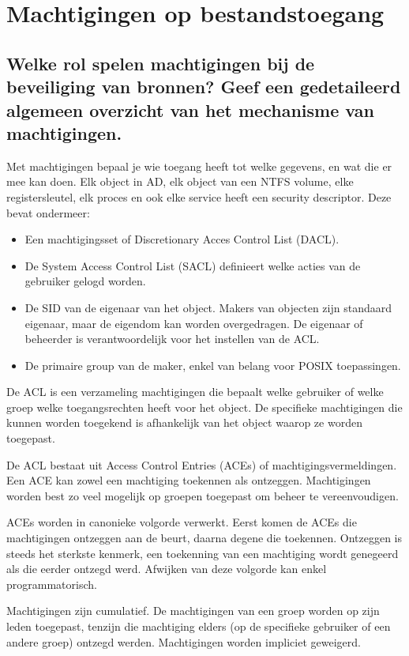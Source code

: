 \chapter{Machtigingen op bestandstoegang}

\section{Welke rol spelen machtigingen bij de beveiliging van bronnen? Geef een
gedetaileerd algemeen overzicht van het mechanisme van machtigingen.}

Met machtigingen bepaal je wie toegang heeft tot welke gegevens, en wat die er
mee kan doen. Elk object in AD, elk object van een NTFS volume, elke
registersleutel, elk proces en ook elke service heeft een security descriptor.
Deze bevat ondermeer:
\begin{itemize}
	\item Een machtigingsset of Discretionary Acces Control List (DACL).
	\item De System Access Control List (SACL) definieert welke acties van
		de gebruiker gelogd worden.
	\item De SID van de eigenaar van het object. Makers van objecten zijn
		standaard eigenaar, maar de eigendom kan worden overgedragen. De
		eigenaar of beheerder is verantwoordelijk voor het instellen van
		de ACL.
	\item De primaire group van de maker, enkel van belang voor POSIX
		toepassingen.
\end{itemize}

De ACL is een verzameling machtigingen die bepaalt welke gebruiker of welke
groep welke toegangsrechten heeft voor het object. De specifieke machtigingen
die kunnen worden toegekend is afhankelijk van het object waarop ze worden
toegepast.

De ACL bestaat uit Access Control Entries (ACEs) of machtigingsvermeldingen. Een
ACE kan zowel een machtiging toekennen als ontzeggen. Machtigingen worden best
zo veel mogelijk op groepen toegepast om beheer te vereenvoudigen.

ACEs worden in canonieke volgorde verwerkt. Eerst komen de ACEs die machtigingen
ontzeggen aan de beurt, daarna degene die toekennen. Ontzeggen is steeds het
sterkste kenmerk, een toekenning van een machtiging wordt genegeerd als die
eerder ontzegd werd. Afwijken van deze volgorde kan enkel programmatorisch.

Machtigingen zijn cumulatief. De machtigingen van een groep worden op zijn leden
toegepast, tenzijn die machtiging elders (op de specifieke gebruiker of een
andere groep) ontzegd werden. Machtigingen worden impliciet geweigerd.

